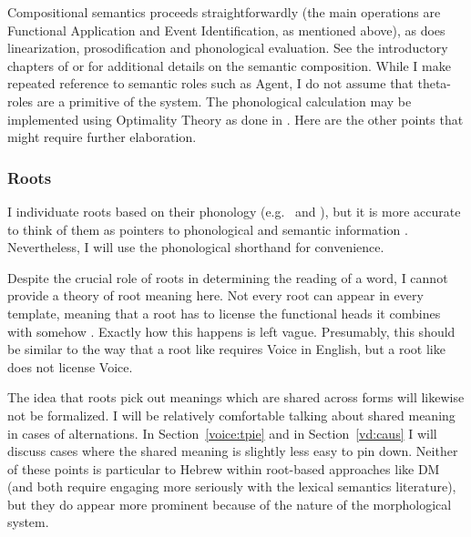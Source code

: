 \begin{exe}
\begin{xlist}
\begin{exe}
\begin{exe}
\begin{exe}
\begin{exe}
\begin{xlist}
\begin{exe}
\begin{xlist}
\begin{xlist}
\begin{xlist}
\begin{exe}
\begin{xlist}
\begin{exe}
\begin{exe}
\begin{xlist}
\begin{exe}
\begin{xlist}
\begin{exe}
\begin{exe}
\begin{xlist}
\label{r1:2:3a}Compositional semantics proceeds straightforwardly (the main operations are Functional Application and Event Identification, as mentioned above), as does linearization, prosodification and phonological evaluation. See the introductory chapters of \cite{wood15springer} or \cite{myler16mit} for additional details on the semantic composition. While I make repeated reference to semantic roles such as Agent, I do not assume that theta-roles are a primitive of the system. The phonological calculation may be implemented using Optimality Theory \citep{ot} as done in \cite{kastner18nllt}. Here are the other points that might require further elaboration.

		\subsubsection{Roots}
I individuate roots based on their phonology (e.g.~ and ), but it is more accurate to think of them as pointers to phonological and semantic information \citep{harley14thlia,faust16,kastner18nllt}. Nevertheless, I will use the phonological shorthand for convenience.

Despite the crucial role of roots in determining the reading of a word, I cannot provide a theory of root meaning here. Not every root can appear in every template, meaning that a root has to license the functional heads it combines with somehow \citep{harleynoyer00}. Exactly how this happens is left vague. Presumably, this  should be similar to the way that a root like  requires Voice in English, but a root like  does not license Voice.

The idea that roots pick out meanings which are shared across forms will likewise not be formalized. I will be relatively comfortable talking about shared meaning in cases of alternations. In Section~\ref{voice:tpie} and in Section~\ref{vd:caus} I will discuss cases where the shared meaning is slightly less easy to pin down. Neither of these points is particular to Hebrew within root-based approaches like DM (and both require engaging more seriously with the lexical semantics literature), but they do appear more prominent because of the nature of the morphological system.


\end{xlist}
\end{exe}
\end{exe}
\end{xlist}
\end{exe}
\end{xlist}
\end{exe}
\end{exe}
\end{xlist}
\end{exe}
\end{xlist}
\end{xlist}
\end{xlist}
\end{exe}
\end{xlist}
\end{exe}
\end{exe}
\end{exe}
\end{exe}
\end{xlist}
\end{exe}
